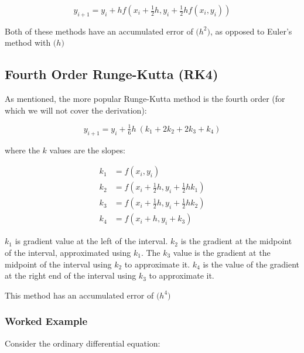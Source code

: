 \documentclass[11pt]{article}
\begin{document}
\[
y_{i+1} = y_i + hf\left(x_i + \tfrac{1}{2} h, y_i + \tfrac{1}{2} h f(x_i, y_i) \right)
\]

Both of these methods have an accumulated error of \(\mathcal(h^2)\), as
opposed to Euler's method with \(\mathcal(h)\)





    \hypertarget{fourth-order-runge-kutta-rk4}{%
\subsection*{Fourth Order Runge-Kutta
(RK4)}\label{fourth-order-runge-kutta-rk4}}





    As mentioned, the more popular Runge-Kutta method is the fourth order
(for which we will not cover the derivation):

\[
y_{i+1} = y_i + \tfrac{1}{6} h~ (k_1 + 2 k_2 + 2 k_3 + k_4)
\]

where the \(k\) values are the slopes:

\[
\begin{align*}
k_1 &= f(x_i, y_i)\\
k_2 &= f\left(x_i + \tfrac{1}{2}h, y_i + \tfrac{1}{2} h k_1 \right)\\
k_3 &= f\left(x_i + \tfrac{1}{2}h, y_i + \tfrac{1}{2} h k_2\right)\\
k_4 &= f(x_i + h, y_i + k_3)
\end{align*}
\]

\(k_1\) is gradient value at the left of the interval. \(k_2\) is the
gradient at the midpoint of the interval, approximated using \(k_1\).
The \(k_3\) value is the gradient at the midpoint of the interval using
\(k_2\) to approximate it. \(k_4\) is the value of the gradient at the
right end of the interval using \(k_3\) to approximate it.

This method has an accumulated error of \(\mathcal(h^4)\)





    \hypertarget{worked-example}{%
\subsubsection*{Worked Example}\label{worked-example}}





    Consider the ordinary differential equation:
\end{document}
